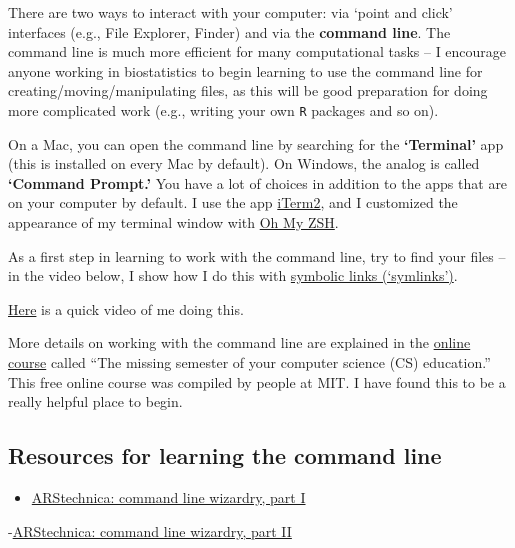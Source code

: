 \documentclass[
]{book}
\providecommand{\tightlist}{%
  \setlength{\itemsep}{0pt}\setlength{\parskip}{0pt}}
\begin{document}
There are two ways to interact with your computer: via `point and click' interfaces (e.g., File Explorer, Finder) and via the \textbf{command line}. The command line is much more efficient for many computational tasks -- I encourage anyone working in biostatistics to begin learning to use the command line for creating/moving/manipulating files, as this will be good preparation for doing more complicated work (e.g., writing your own \texttt{R} packages and so on).

On a Mac, you can open the command line by searching for the \textbf{`Terminal'} app (this is installed on every Mac by default). On Windows, the analog is called \textbf{`Command Prompt.'} You have a lot of choices in addition to the apps that are on your computer by default. I use the app \href{https://iterm2.com/}{iTerm2}, and I customized the appearance of my terminal window with \href{https://ohmyz.sh/}{Oh My ZSH}.

As a first step in learning to work with the command line, try to find your files -- in the video below, I show how I do this with \href{https://www.freecodecamp.org/news/linux-ln-how-to-create-a-symbolic-link-in-linux-example-bash-command/}{symbolic links (`symlinks')}.

\href{https://youtu.be/f-xsKZVWavo}{Here} is a quick video of me doing this.

More details on working with the command line are explained in the \href{https://missing.csail.mit.edu/}{online course} called ``The missing semester of your computer science (CS) education.'' This free online course was compiled by people at MIT. I have found this to be a really helpful place to begin.

\hypertarget{resources-for-learning-the-command-line}{%
\subsection{Resources for learning the command line}\label{resources-for-learning-the-command-line}}

\begin{itemize}
\tightlist
\item
  \href{https://arstechnica.com/gadgets/2021/08/linux-bsd-command-line-101-using-awk-sed-and-grep-in-the-terminal/}{ARStechnica: command line wizardry, part I}
\end{itemize}

-\href{https://arstechnica.com/gadgets/2021/09/command-line-wizardry-part-two-variables-and-loops-in-bash/}{ARStechnica: command line wizardry, part II}
\end{document}
